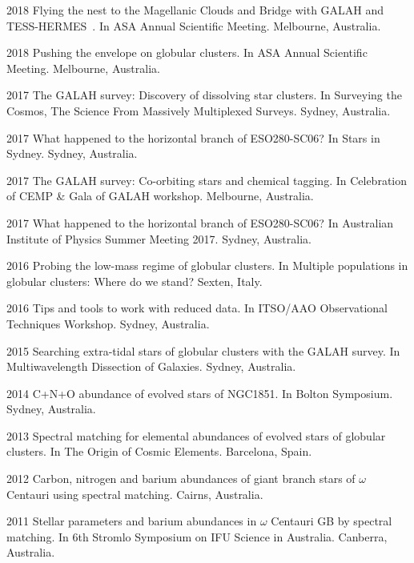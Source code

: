 \item[{\color{numcolor}\scriptsize21}] 2018 Flying the nest to the Magellanic Clouds and Bridge with GALAH and TESS-HERMES~. In ASA Annual Scientific Meeting. Melbourne, Australia.
\item[{\color{numcolor}\scriptsize21}] 2018 Pushing the envelope on globular clusters. In ASA Annual Scientific Meeting. Melbourne, Australia.
\item[{\color{numcolor}\scriptsize21}] 2017 The GALAH survey: Discovery of dissolving star clusters. In Surveying the Cosmos, The Science From Massively Multiplexed Surveys. Sydney, Australia.
\item[{\color{numcolor}\scriptsize21}] 2017 What happened to the horizontal branch of ESO280-SC06? In Stars in Sydney. Sydney, Australia.
\item[{\color{numcolor}\scriptsize21}] 2017 The GALAH survey: Co-orbiting stars and chemical tagging. In Celebration of CEMP & Gala of GALAH workshop. Melbourne, Australia.
\item[{\color{numcolor}\scriptsize21}] 2017 What happened to the horizontal branch of ESO280-SC06? In Australian Institute of Physics Summer Meeting 2017. Sydney, Australia.
\item[{\color{numcolor}\scriptsize21}] 2016 Probing the low-mass regime of globular clusters. In Multiple populations in globular clusters: Where do we stand? Sexten, Italy.
\item[{\color{numcolor}\scriptsize21}] 2016 Tips and tools to work with reduced data. In ITSO/AAO Observational Techniques Workshop. Sydney, Australia.
\item[{\color{numcolor}\scriptsize21}] 2015 Searching extra-tidal stars of globular clusters with the GALAH survey. In Multiwavelength Dissection of Galaxies. Sydney, Australia.
\item[{\color{numcolor}\scriptsize21}] 2014 C+N+O abundance of evolved stars of NGC1851. In Bolton Symposium. Sydney, Australia.
\item[{\color{numcolor}\scriptsize21}] 2013 Spectral matching for elemental abundances of evolved stars of globular clusters. In The Origin of Cosmic Elements. Barcelona, Spain.
\item[{\color{numcolor}\scriptsize21}] 2012 Carbon, nitrogen and barium abundances of giant branch stars of $ω$ Centauri using spectral matching. Cairns, Australia.
\item[{\color{numcolor}\scriptsize21}] 2011 Stellar parameters and barium abundances in $ω$ Centauri GB by spectral matching. In 6th Stromlo Symposium on IFU Science in Australia. Canberra, Australia.
